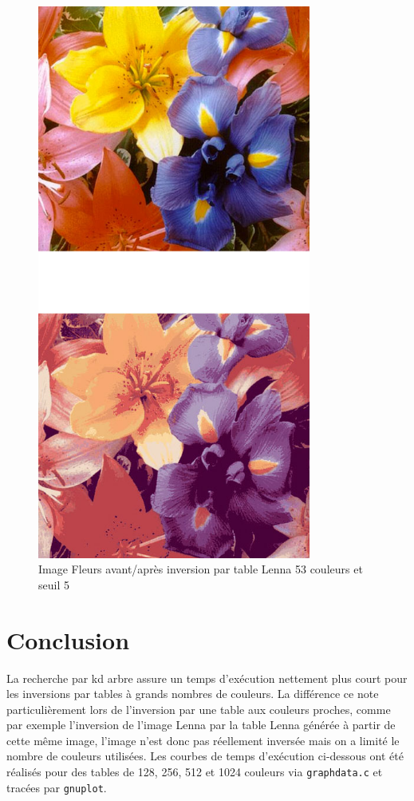 \documentclass[a4paper,11pt,final]{article}
\begin{document}
\begin{figure}[!ht]
    \centering
    \includegraphics[width=90mm]{./pic/beforeAfter53v.jpg}
    \caption{Image Fleurs avant/après inversion par table Lenna 53 couleurs et seuil 5}
\end{figure}

\section{Conclusion}

La recherche par kd arbre assure un temps d’exécution nettement plus court pour les inversions par tables à grands nombres de couleurs. La différence ce note particulièrement lors de l’inversion par une table aux couleurs proches, comme par exemple l’inversion de l’image Lenna par la table Lenna générée à partir de cette même image, l’image n’est donc pas réellement inversée mais on a limité le nombre de couleurs utilisées. Les courbes de temps d'exécution ci-dessous ont été réalisés pour des tables de 128, 256, 512 et 1024 couleurs via \texttt{graphdata.c} et tracées par \texttt{gnuplot}.
\end{document}

